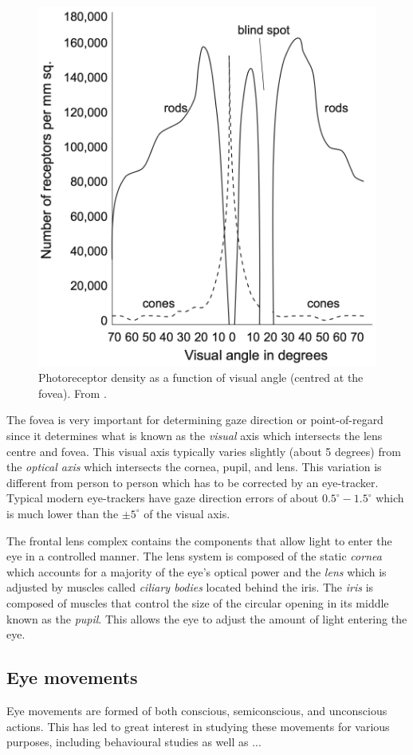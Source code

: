 \begin{figure}
    \centering
    \includegraphics[width=0.6\linewidth]{figures/retina-density.png}
    \caption{Photoreceptor density as a function of visual angle (centred at the fovea). From \parencite{methodology}.}
    \label{fig:my_label}
\end{figure}

The fovea is very important for determining gaze direction or point-of-regard since it determines what is known as the \emph{visual} axis which intersects the lens centre and fovea. This visual axis typically varies slightly (about 5 degrees) from the \emph{optical axis} which intersects the cornea, pupil, and lens. This variation is different from person to person which has to be corrected by an eye-tracker. Typical modern eye-trackers have gaze direction errors of about $0.5^\circ-1.5^\circ$ which is much lower than the $\pm 5^\circ$ of the visual axis.

The frontal lens complex contains the components that allow light to enter the eye in a controlled manner. The lens system is composed of the static \emph{cornea} which accounts for a majority of the eye's optical power and the \emph{lens} which is adjusted by muscles called \emph{ciliary bodies} located behind the iris. The \emph{iris} is composed of muscles that control the size of the circular opening in its middle known as the \emph{pupil}. This allows the eye to adjust the amount of light entering the eye. 

\subsection{Eye movements}
Eye movements are formed of both conscious, semiconscious, and unconscious actions. This has led to great interest in studying these movements for various purposes, including behavioural studies as well as ...

